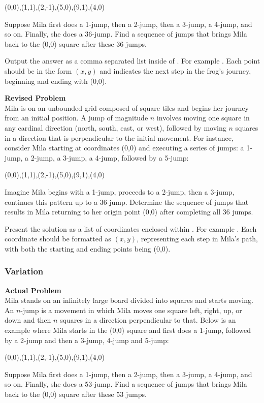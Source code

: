 (0,0),(1,1),(2,-1),(5,0),(9,1),(4,0)

Suppose Mila first does a 1-jump, then a 2-jump, then a 3-jump, a 4-jump, and so on. Finally, she does a 36-jump. Find a sequence of jumps that brings Mila back to the (0,0) square after these $36$ jumps.

Output the answer as a comma separated list inside of . For example . Each point should be in the form $(x, y)$ and indicates the next step in the frog's journey, beginning and ending with (0,0).

\textbf{Revised Problem}\\
Mila is on an unbounded grid composed of square tiles and begins her journey from an initial position. A jump of magnitude $n$ involves moving one square in any cardinal direction (north, south, east, or west), followed by moving $n$ squares in a direction that is perpendicular to the initial movement. For instance, consider Mila starting at coordinates (0,0) and executing a series of jumps: a 1-jump, a 2-jump, a 3-jump, a 4-jump, followed by a 5-jump:

(0,0),(1,1),(2,-1),(5,0),(9,1),(4,0)

Imagine Mila begins with a 1-jump, proceeds to a 2-jump, then a 3-jump, continues this pattern up to a 36-jump. Determine the sequence of jumps that results in Mila returning to her origin point (0,0) after completing all 36 jumps.

Present the solution as a list of coordinates enclosed within . For example . Each coordinate should be formatted as $(x, y)$, representing each step in Mila's path, with both the starting and ending points being (0,0).

\subsubsection{Variation}
\textbf{Actual Problem}\\
Mila stands on an infinitely large board divided into squares and starts moving. An $n$-jump is a movement in which Mila moves one square left, right, up, or down and then $n$ squares in a direction perpendicular to that. Below is an example where Mila starts in the (0,0) square and first does a 1-jump, followed by a 2-jump and then a 3-jump, 4-jump and 5-jump:

(0,0),(1,1),(2,-1),(5,0),(9,1),(4,0)

Suppose Mila first does a 1-jump, then a 2-jump, then a 3-jump, a 4-jump, and so on. Finally, she does a 53-jump. Find a sequence of jumps that brings Mila back to the (0,0) square after these $53$ jumps.

